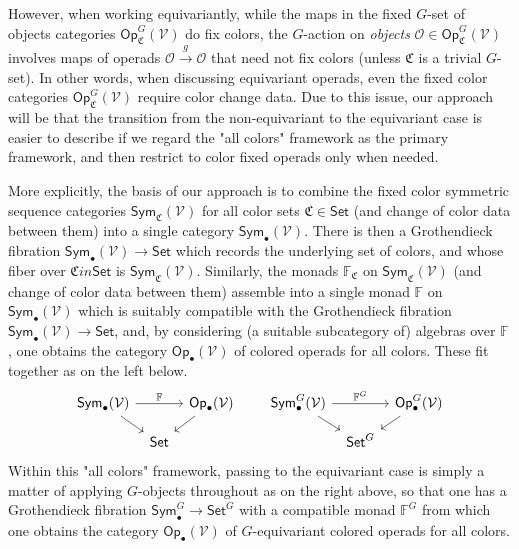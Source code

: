 \documentclass[a4paper,10pt
,draft
]{article}%
\numberwithin{equation}{section}
\numberwithin{figure}{section}
\theoremstyle{definition} %
\newcommand{\Sym}{\ensuremath{\mathsf{Sym}}}%
\newcommand{\Op}{\mathsf{Op}}%
\newcommand{\V}{\ensuremath{\mathcal V}}
\renewcommand{\O}{\ensuremath{\mathcal O}}
\newcommand{\1}{\ensuremath{\mathbbm 1}}%
\begin{document}
However, when working equivariantly, 
while the maps in the fixed $G$-set of objects categories 
$\mathsf{Op}^G_{\mathfrak{C}}(\V)$ do fix colors, 
the $G$-action on \emph{objects}
$\O \in \mathsf{Op}^G_{\mathfrak{C}}(\V)$
involves maps of operads $\O \xrightarrow{g} \O$
that need not fix colors (unless $\mathfrak{C}$ is a trivial $G$-set).
In other words, when discussing equivariant operads,
even the fixed color categories 
$\mathsf{Op}^G_{\mathfrak{C}}(\V)$
require color change data.
Due to this issue, 
our approach will be that the transition from the non-equivariant to the equivariant case is easier to describe 
if we regard the "all colors" framework as the primary framework,
and then restrict to color fixed operads only when needed.

More explicitly, the basis of our approach is to combine the 
fixed color symmetric sequence categories
$\mathsf{Sym}_{\mathfrak{C}}(\V)$ for all color sets 
$\mathfrak{C} \in \mathsf{Set}$
(and change of color data between them)
into a single category $\mathsf{Sym}_{\bullet}(\V)$.
There is then a Grothendieck fibration
$\mathsf{Sym}_{\bullet}(\V) \to \mathsf{Set}$
which records the underlying set of colors,
and whose fiber over $\mathfrak{C} in \mathsf{Set}$ is 
$\mathsf{Sym}_{\mathfrak{C}}(\V)$.
Similarly, the monads $\mathbb{F}_{\mathfrak{C}}$
on $\mathsf{Sym}_{\mathfrak{C}}(\mathcal{V})$
(and change of color data between them) 
assemble into a single monad $\mathbb{F}$
on $\mathsf{Sym}_{\bullet}(\V)$
which is suitably compatible with 
the Grothendieck fibration 
$\mathsf{Sym}_{\bullet}(\V) \to \mathsf{Set}$,
and, by considering (a suitable subcategory of) algebras over $\mathbb{F}$,
one obtains the category $\mathsf{Op}_{\bullet}(\V)$
of colored operads for all colors.
These fit together as on the left below.
\begin{equation}\label{FIBADJMON EQ}
\begin{tikzcd}[row sep = small, column sep = tiny]
\Sym_\bullet(\V) \arrow[rr, "\mathbb F"] \arrow[dr]
&&
\Op_\bullet(\V) \arrow[dl]
&&& %
\Sym^G_\bullet(\V) \arrow[rr, "\mathbb F^G"] \arrow[dr]
&&
\Op^G_\bullet(\V) \arrow[dl]
\\
&
\mathsf{Set}
&
&&& %
&
\mathsf{Set}^G
\end{tikzcd}
\end{equation}
Within this "all colors" framework, passing to the equivariant case is simply a matter of applying $G$-objects throughout as on the right above, 
so that one has a Grothendieck fibration
$\mathsf{Sym}_{\bullet}^G \to \mathsf{Set}^G$
with a compatible monad $\mathbb{F}^G$
from which one obtains the category 
$\mathsf{Op}_{\bullet}(\V)$
of $G$-equivariant colored operads for all colors. 
\end{document}
